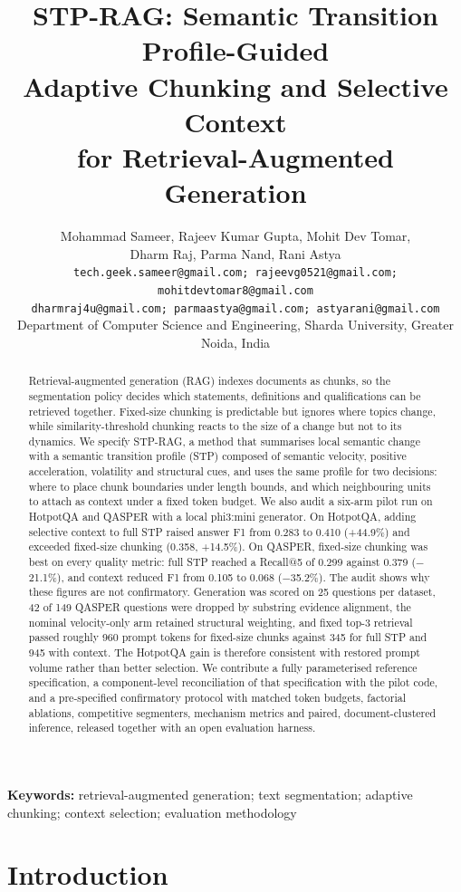 \documentclass[10pt,a4paper]{article}
\title{\textbf{STP-RAG: Semantic Transition Profile-Guided\\Adaptive Chunking and Selective Context\\for Retrieval-Augmented Generation}}
\author{Mohammad Sameer, Rajeev Kumar Gupta, Mohit Dev Tomar,\\
Dharm Raj, Parma Nand, Rani Astya\\[2pt]
{\fontsize{7}{8.4}\selectfont\texttt{tech.geek.sameer@gmail.com; rajeevg0521@gmail.com; mohitdevtomar8@gmail.com}}\\[-1pt]
{\fontsize{7}{8.4}\selectfont\texttt{dharmraj4u@gmail.com; parmaastya@gmail.com; astyarani@gmail.com}}\\[2pt]
\small Department of Computer Science and Engineering, Sharda University, Greater Noida, India}
\date{}
\begin{document}
\maketitle

\begin{abstract}
\noindent Retrieval-augmented generation (RAG) indexes documents as chunks, so the segmentation policy decides which statements, definitions and qualifications can be retrieved together. Fixed-size chunking is predictable but ignores where topics change, while similarity-threshold chunking reacts to the size of a change but not to its dynamics. We specify STP-RAG, a method that summarises local semantic change with a semantic transition profile (STP) composed of semantic velocity, positive acceleration, volatility and structural cues, and uses the same profile for two decisions: where to place chunk boundaries under length bounds, and which neighbouring units to attach as context under a fixed token budget. We also audit a six-arm pilot run on HotpotQA and QASPER with a local phi3:mini generator. On HotpotQA, adding selective context to full STP raised answer F1 from 0.283 to 0.410 (+44.9\%) and exceeded fixed-size chunking (0.358, +14.5\%). On QASPER, fixed-size chunking was best on every quality metric: full STP reached a Recall@5 of 0.299 against 0.379 ($-$21.1\%), and context reduced F1 from 0.105 to 0.068 ($-$35.2\%). The audit shows why these figures are not confirmatory. Generation was scored on 25 questions per dataset, 42 of 149 QASPER questions were dropped by substring evidence alignment, the nominal velocity-only arm retained structural weighting, and fixed top-3 retrieval passed roughly 960 prompt tokens for fixed-size chunks against 345 for full STP and 945 with context. The HotpotQA gain is therefore consistent with restored prompt volume rather than better selection. We contribute a fully parameterised reference specification, a component-level reconciliation of that specification with the pilot code, and a pre-specified confirmatory protocol with matched token budgets, factorial ablations, competitive segmenters, mechanism metrics and paired, document-clustered inference, released together with an open evaluation harness.
\end{abstract}

\noindent\textbf{Keywords:} retrieval-augmented generation; text segmentation; adaptive chunking; context selection; evaluation methodology

\section{Introduction}
\label{sec:intro}
\end{document}
